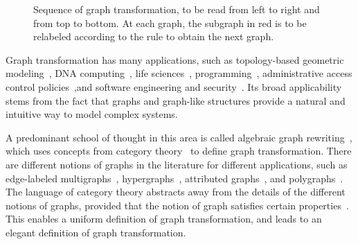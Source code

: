 \begin{figure}[H]
{
}
        \caption{Sequence of graph transformation, to be read from left to right and from top to bottom. At each graph, the subgraph in red is to be relabeled according to the rule to obtain the next graph.}
        \label{fig:intro_sequence_of_transformation}
    \end{figure}
 
 Graph transformation has many applications, such as topology-based geometric modeling~\cite{poudret2007topology,poudret2008graph_transformation, belhaouari2014jerboa, bellet2017geometric, pascale2022Geometric_modeling,arnould2022preserving_consistency}, DNA computing~\cite{harju2004tutorial_dna_computation}, life sciences~\cite{behr2021rewriting_life_sciences}, programming~\cite{plump2009graph_programming_language}, administrative access control policies~\cite{bertolissi2025category_based, bertolissi2021graph_based,koch2001specification_evolution_access_control},and software engineering and security~\cite{heckel2020software_engineers}. Its broad applicability stems from the fact that graphs and graph-like structures provide a natural and intuitive way to model complex systems. 
 
 A predominant school of thought in this area is called algebraic graph rewriting~\cite{ehrig1997handbook1,ehrig1999handbook2,ehrig1999handbook3}, which uses concepts from category theory~\cite{pierce1991basic,barr1990category,maclane2013categories} to define graph transformation. 
 There are different notions of graphs in the literature for different applications, such as edge-labeled multigraphs~\cite{konig2018atutorial,corradini1997algebraic}, hypergraphs~\cite{plump1993hypergraph}, attributed graphs~\cite{ehrig2006fundamentals}, and polygraphs~\cite{ara2023polygraphs}.
 The language of category theory abstracts away from the details of the different notions of graphs, provided that the notion of graph satisfies certain properties~\cite{lack2004adhesive,overbeek2023graph}.  
This enables a uniform definition of graph transformation, and leads to an elegant definition of graph transformation. 

